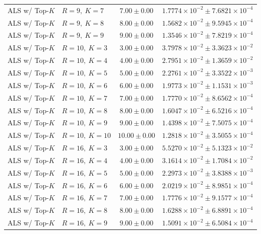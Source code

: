 \begin{table}[t]
\begin{tabular}{@{}llcc@{}}
ALS w/ Top-\(K\) & \(R=9,\ K=7\) & \(7.00 \pm 0.00\) & \(1.7774{\times}10^{-2} \pm 7.6821{\times}10^{-4}\) \\
ALS w/ Top-\(K\) & \(R=9,\ K=8\) & \(8.00 \pm 0.00\) & \(1.5682{\times}10^{-2} \pm 9.5945{\times}10^{-4}\) \\
ALS w/ Top-\(K\) & \(R=9,\ K=9\) & \(9.00 \pm 0.00\) & \(1.3546{\times}10^{-2} \pm 7.8219{\times}10^{-4}\) \\
ALS w/ Top-\(K\) & \(R=10,\ K=3\) & \(3.00 \pm 0.00\) & \(3.7978{\times}10^{-2} \pm 3.3623{\times}10^{-2}\) \\
ALS w/ Top-\(K\) & \(R=10,\ K=4\) & \(4.00 \pm 0.00\) & \(2.7951{\times}10^{-2} \pm 1.3659{\times}10^{-2}\) \\
ALS w/ Top-\(K\) & \(R=10,\ K=5\) & \(5.00 \pm 0.00\) & \(2.2761{\times}10^{-2} \pm 3.3522{\times}10^{-3}\) \\
ALS w/ Top-\(K\) & \(R=10,\ K=6\) & \(6.00 \pm 0.00\) & \(1.9773{\times}10^{-2} \pm 1.1531{\times}10^{-3}\) \\
ALS w/ Top-\(K\) & \(R=10,\ K=7\) & \(7.00 \pm 0.00\) & \(1.7770{\times}10^{-2} \pm 8.6562{\times}10^{-4}\) \\
ALS w/ Top-\(K\) & \(R=10,\ K=8\) & \(8.00 \pm 0.00\) & \(1.6047{\times}10^{-2} \pm 6.5216{\times}10^{-4}\) \\
ALS w/ Top-\(K\) & \(R=10,\ K=9\) & \(9.00 \pm 0.00\) & \(1.4398{\times}10^{-2} \pm 7.5075{\times}10^{-4}\) \\
ALS w/ Top-\(K\) & \(R=10,\ K=10\) & \(10.00 \pm 0.00\) & \(1.2818{\times}10^{-2} \pm 3.5055{\times}10^{-4}\) \\
ALS w/ Top-\(K\) & \(R=16,\ K=3\) & \(3.00 \pm 0.00\) & \(5.5270{\times}10^{-2} \pm 5.1323{\times}10^{-2}\) \\
ALS w/ Top-\(K\) & \(R=16,\ K=4\) & \(4.00 \pm 0.00\) & \(3.1614{\times}10^{-2} \pm 1.7084{\times}10^{-2}\) \\
ALS w/ Top-\(K\) & \(R=16,\ K=5\) & \(5.00 \pm 0.00\) & \(2.2973{\times}10^{-2} \pm 3.8388{\times}10^{-3}\) \\
ALS w/ Top-\(K\) & \(R=16,\ K=6\) & \(6.00 \pm 0.00\) & \(2.0219{\times}10^{-2} \pm 8.9851{\times}10^{-4}\) \\
ALS w/ Top-\(K\) & \(R=16,\ K=7\) & \(7.00 \pm 0.00\) & \(1.7776{\times}10^{-2} \pm 9.1577{\times}10^{-4}\) \\
ALS w/ Top-\(K\) & \(R=16,\ K=8\) & \(8.00 \pm 0.00\) & \(1.6288{\times}10^{-2} \pm 6.8891{\times}10^{-4}\) \\
ALS w/ Top-\(K\) & \(R=16,\ K=9\) & \(9.00 \pm 0.00\) & \(1.5091{\times}10^{-2} \pm 6.5084{\times}10^{-4}\) \\

\end{tabular}
\end{table}
